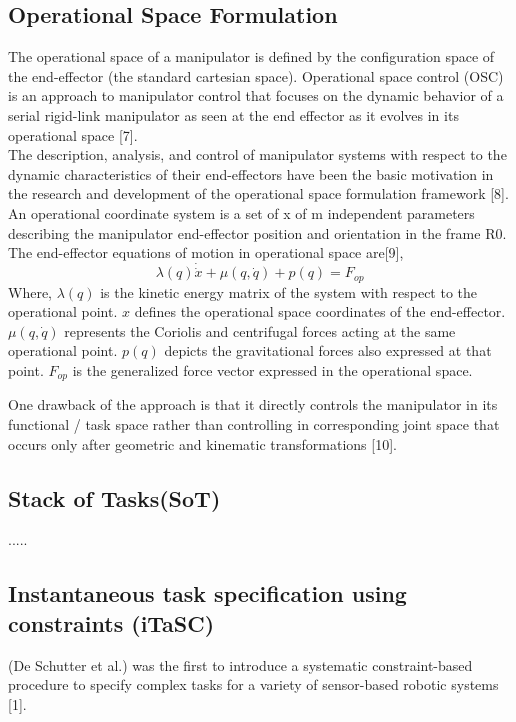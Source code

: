 \subsection{Operational Space Formulation}
The operational space of a manipulator is defined by the configuration space of the end-effector (the standard cartesian space). Operational space control (OSC) is an approach to manipulator control that focuses on the dynamic behavior of a serial rigid-link manipulator as seen at the end effector as it evolves in its operational space [7]. \\ The description, analysis, and control of manipulator systems with respect to the dynamic characteristics of their end-effectors have been the basic motivation in the research and development of the operational space formulation framework [8]. \\ An operational coordinate system is a set of x of m independent parameters describing the manipulator end-effector position and orientation in the frame R0. The end-effector equations of motion in operational space are[9],\\
\textbf{$$ \lambda(q) \dot{\dot x} + \mu (q, \dot q) + p(q) = F_{op} $$}
Where, $\lambda (q)$ is the kinetic energy matrix of the system with respect to the operational point. $x$ defines the operational space coordinates of the end-effector.\\	
$\mu (q, \dot q)$ represents the Coriolis and centrifugal forces acting at the same operational point. $p(q)$ depicts the gravitational forces also expressed at that point.	$F_{op}$ is the generalized force vector expressed in the operational space.


One drawback of the approach is that it directly controls the manipulator in its functional / task space rather than controlling in corresponding joint space that occurs only after geometric and kinematic transformations [10].

\subsection{Stack of Tasks(SoT)}{.....}

\subsection{Instantaneous task specification using constraints (iTaSC)}
(De Schutter et al.) was the first to introduce a systematic constraint-based procedure to specify complex tasks for a variety of sensor-based robotic systems [1].


